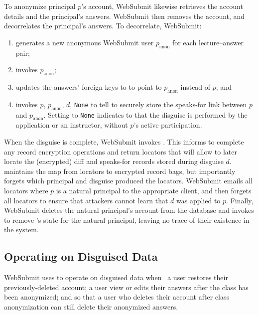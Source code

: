 %
To anonymize principal $p$'s account, WebSubmit likewise retrieves the account
details and the principal's answers.
%
WebSubmit then removes the account, and decorrelates the principal's answers.
%
To decorrelate, WebSubmit:
%
\begin{enumerate}[nosep]
%
\item generates a new anonymous WebSubmit user $p_{\textrm{anon}}$ for each
  lecture--answer pair;
%
\item invokes $p_{\textrm{anon}}$\fn{)};
%
\item updates the answers' foreign keys to  to point to
  $p_{\textrm{anon}}$ instead of $p$; and
%
\item invokes $p$, $p_{\texttt{anon}}$, $d$, \texttt{None}\fn{)} to tell
    \sys to securely store the speaks-for link between $p$ and $p_{\texttt{anon}}$. Setting
         to \texttt{None} indicates to \sys that the disguise is performed by the
        application or an instructor, without $p$'s active
        participation.
\end{enumerate}
%

%
When the disguise is complete, WebSubmit invokes .
%
This informs \sys to complete any record encryption operations and return locators  that
will allow \sys to later locate the (encrypted) diff and speaks-for records stored during disguise
$d$. 
%
\sys maintains the map from locators to encrypted record bags, but importantly forgets which
principal and disguise produced the locators. 
%
WebSubmit emails all locators  where $p$ is a natural principal to the appropriate client,
and then forgets all locators to ensure that attackers cannot learn that $d$ was applied to $p$.
%
Finally, WebSubmit deletes the natural principal's account from the database and
invokes  to remove \sys's state for the natural principal,
leaving no trace of their existence in the system.
%

\subsection{Operating on Disguised Data}
\label{s:op-disg}

%
WebSubmit uses \sys to operate on disguised data when \one{} a user restores their
previously-deleted account; \two{} a user view or edits their answers after the
class has been anonymized; and \three{} so that a user who deletes their account
after class anonymization can still delete their anonymized answers.
%

